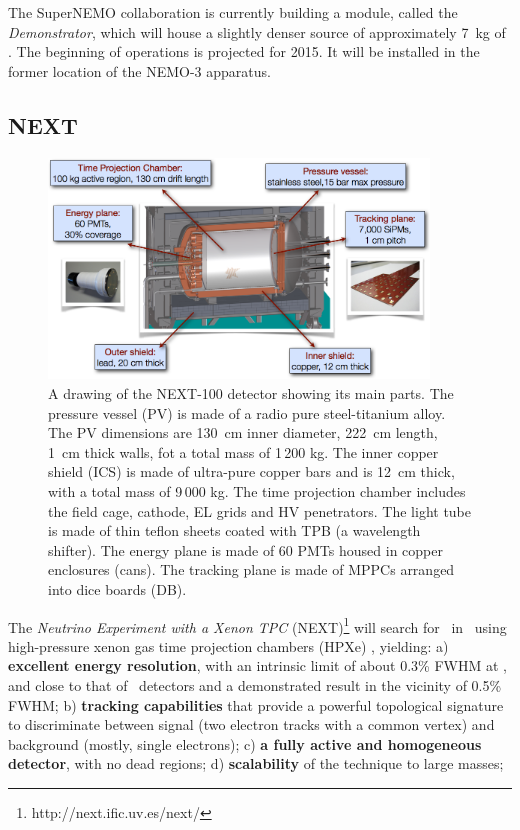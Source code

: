 \documentclass{PoS}
\begin{document}
The SuperNEMO collaboration is currently building a module, 
called the \emph{Demonstrator}, which will house a slightly denser source of approximately 7~kg of \SE. The beginning of operations is projected for 2015. It will be installed in the former location of the NEMO-3 apparatus. 

\subsection{NEXT}

\begin{figure}
\centering
\includegraphics[width=0.9\textwidth]{img/NEXT.png}
\caption{\small A drawing of the NEXT-100 detector showing its main parts. The pressure vessel (PV) is made of a radio pure steel-titanium alloy. The PV dimensions are 130~cm inner diameter, 222~cm length, 1~cm thick walls, fot a total mass of 1\,200 kg. The inner copper shield (ICS) is made of ultra-pure copper bars and is 12~cm thick, with a total mass of 9\,000 kg. The time projection chamber includes the field cage, cathode, EL grids and HV penetrators.
The light tube is made of thin teflon sheets coated with TPB (a wavelength shifter). 
The energy plane is made of 60 PMTs housed in copper enclosures (cans).
The tracking plane is made of MPPCs arranged into dice boards (DB). 
} \label{fig.NEXT100}
\end{figure}

The \emph{Neutrino Experiment with a Xenon TPC} (NEXT)\footnote{http://next.ific.uv.es/next/} will search for \bbonu\ in \XE\ using  high-pressure xenon gas  time projection chambers 
(HPXe) \cite{Nygren:2009zz, Granena:2009it, Alvarez:2012haa}, yielding: 
a) {\bf excellent energy resolution}, with an intrinsic limit of about 0.3\% FWHM at \Qbb, and close to that of \GE\ detectors and a demonstrated result in the vicinity of 0.5\% FWHM; b)
{\bf tracking capabilities} that provide a powerful topological signature to discriminate between signal (two electron tracks with a common vertex) and background (mostly, single electrons); c)
{\bf a fully active and homogeneous detector}, with no dead regions; d) {\bf scalability} of the technique to large masses; 
\end{document}
